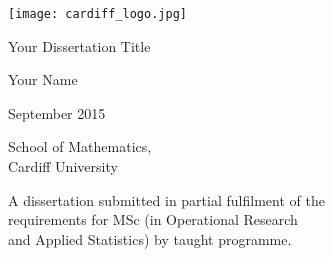 \begin{titlepage}
	\begin{center}
		\vspace*{1cm}
		\texttt{[image: cardiff\_logo.jpg]} 
		
		\vspace{60pt}
		
		\Huge
		Your Dissertation Title
		
		\vspace{2cm}
		
		\Large
		Your Name
		
		\vspace{2cm}
		\large
		September 2015
		
		\vspace{2cm}
		
		School of Mathematics,\\Cardiff University
		
		\vfill
		
		\normalsize
		A dissertation submitted in partial fulfilment of the\\ requirements for MSc (in
		Operational Research\\ and Applied Statistics) by taught programme.
	
	\end{center}
\end{titlepage}